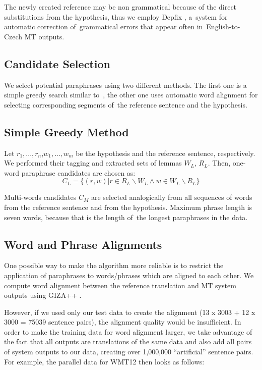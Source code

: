\documentclass[11pt]{article}
\def\equo#1{``#1''}
\begin{document}
The newly created reference may be non grammatical because of the direct
substitutions from the hypothesis, thus we employ Depfix \cite{depfix}, 
a~system for automatic correction of~grammatical errors that appear often 
in~English-to-Czech MT outputs. 

\subsection{Candidate Selection}
We select potential paraphrases using two different methods. The first one is a 
simple greedy search similar to~, the other one uses automatic 
word alignment for selecting corresponding segments of~the reference sentence 
and the hypothesis.

\subsection*{Simple Greedy Method}
Let $ r_1,..., r_n $,$ w_1,...,w_m $ be the hypothesis and the reference 
sentence, respectively. We performed their tagging and extracted sets of lemmas 
$ W_{L} $, $ R_{L} $. Then, one-word paraphrase candidates are chosen as:
$$ C_{L} = \lbrace (r,w) | r \in R_{L} \smallsetminus W_{L} \wedge w \in W_{L}
\smallsetminus R_{L}  \rbrace $$

Multi-words candidates $ C_M $ are selected analogically from all sequences 
of words from the reference sentence and from the hypothesis. Maximum phrase 
length is seven words, because that is the length of~the longest paraphrases in 
the data. %
%

\subsection*{Word and Phrase Alignments}
One possible way to make the algorithm more reliable is to restrict the 
application of paraphrases to words/phrases which are aligned to each other. We 
compute word alignment between the reference translation and MT system outputs 
using GIZA++ \cite{gizapp}.

However, if we used only our test data to create the alignment (13 x 3003 + 12 
x 3000 = 75039 sentence pairs), the alignment quality would be insufficient. In 
order to make the training data for word alignment larger, we take advantage of 
the fact that all outputs are translations of the same data and also add all 
pairs of system outputs to our data, creating over 1,000,000 \equo{artificial} 
sentence pairs. For example, the parallel data for WMT12 then looks as follows:
\end{document}

